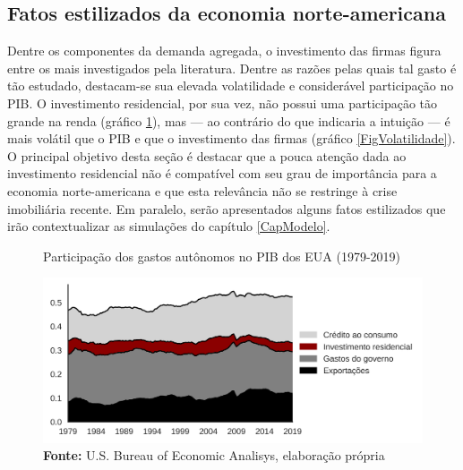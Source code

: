 \subsection{Fatos estilizados da economia norte-americana}\label{FatosEUA}


Dentre os componentes da demanda agregada, o investimento das firmas figura entre os mais investigados pela literatura.
Dentre as razões pelas quais tal gasto é tão estudado, destacam-se sua elevada volatilidade e considerável participação no PIB.
O investimento residencial, por sua vez, não possui uma participação tão grande na renda (gráfico \ref{FigAutonomos}), mas --- ao contrário do que indicaria a intuição --- é mais volátil que o PIB e que o investimento das firmas (gráfico \ref{FigVolatilidade}). 
O principal objetivo desta seção é destacar que a pouca atenção dada ao investimento residencial não é compatível com seu grau de importância para a economia norte-americana e que esta relevância não se restringe à crise imobiliária recente.
Em paralelo, serão apresentados alguns fatos estilizados que irão contextualizar as simulações do capítulo \ref{CapModelo}.




\begin{figure}[H]
	\centering
	\caption{Participação dos gastos autônomos no PIB dos EUA (1979-2019)}
	\label{FigAutonomos}
	\includegraphics[width=\textwidth]{../../Dados/Fatos_Estilizados/figs/Gastos_autonomos.png}
	\caption*{\textbf{Fonte:} U.S. Bureau of Economic Analisys, elaboração própria}
\end{figure}


